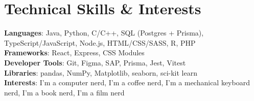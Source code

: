 \documentclass[letterpaper,11pt]{article}
\begin{document}
%
\section{Technical Skills \& Interests}
 \begin{itemize}[leftmargin=0.15in, label={}]
    \small{\item{
     \textbf{Languages}{: Java, Python, C/C++, SQL (Postgres + Prisma), TypeScript/JavaScript, Node.js, HTML/CSS/SASS, R, PHP} \\
     \textbf{Frameworks}{: React, Express, CSS Modules} \\
     \textbf{Developer Tools}{: Git, Figma, SAP, Prisma, Jest, Vitest} \\
     \textbf{Libraries}{: pandas, NumPy, Matplotlib, seaborn, sci-kit learn} \\
     \textbf{Interests}{: I’m a computer nerd, I’m a coffee nerd, I’m a mechanical keyboard nerd, I’m a book nerd, I’m a film nerd}
    }}
 \end{itemize}


\end{document}
